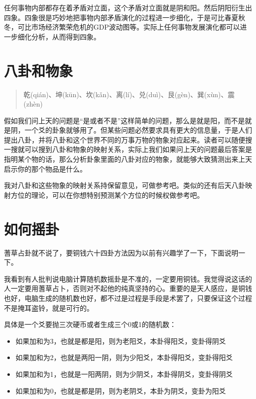\documentclass[12pt,oneside]{book}
\begin{document}
任何事物内部都存在着矛盾对立面，这个矛盾对立面就是阴和阳。然后阴阳衍生出四象。四象很是巧妙地把事物内部矛盾演化的过程进一步细化，于是可比春夏秋冬，可比市场经济繁荣危机的GDP波动图等。实际上任何事物发展演化都可以进一步细化分析，从而得到四象。

\section{八卦和物象}
\begin{quote}
乾(qián)、坤(kūn)、坎(kǎn)、离(lí)、兑(duì)、艮(gèn)、巽(xùn)、震(zhèn)
\end{quote}


假如我们问上天的问题是“是或者不是”这样简单的问题，那么是就是阳，而不是就是阴，一个爻的卦象就够用了。但某些问题必然要求具有更大的信息量，于是人们提出八卦，并将八卦和这个世界不同的万事万物的物象对应起来。读者可以随便搜一搜就可以搜到八卦和物象的映射关系，实际上我们如果问上天的问题最后答案是指明某个物的话，那么分析卦象里面的八卦对应的物象，就能够大致猜测出来上天启示你的那个物品是什么。

我对八卦和这些物象的映射关系持保留意见，可做参考吧。类似的还有后天八卦映射方位的理论，可以在你想特别预测某个方位的时候权做参考吧。





\section{如何摇卦}
蓍草占卦就不说了，要铜钱六十四卦方法因为以前有兴趣学了一下，下面说明一下。

我看到有人批判说电脑计算随机数摇卦是不准的，一定要用铜钱。我觉得说这话的人一定要用蓍草占卜，否则对不起他的纯真坚持的心。重要的是天人感应，是铜钱也好，电脑生成的随机数也好，都不过是过程是手段是术罢了，只要保证这个过程不是掩耳盗铃，就是可行的。

具体是一个爻要抛三次硬币或者生成三个0或1的随机数：

\begin{itemize}
\item 如果加和为3，也就是都是阳，则为老阳爻，本卦得阳爻，变卦得阴爻
\item 如果加和为2，也就是两阳一阴，则为少阳爻，本卦得阳爻，变卦得阳爻
\item 如果加和为1，也就是一阳两阴，则为少阴爻，本卦得阴爻，变卦得阴爻
\item 如果加和为0，也就是都是阴，则为老阴爻，本卦为阴爻，变卦为阳爻
\end{itemize}
\end{document}
